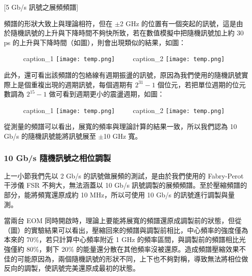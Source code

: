 \documentclass[class=NCU_thesis, crop=false]{standalone}
\begin{document}
[5 Gb/s 訊號之展頻頻譜]

頻譜的形狀大致上與理論相符，但在 $\pm$2 GHz 的位置有一個突起的訊號，這是由於隨機訊號的上升與下降時間不夠快所致，若在數值模擬中把隨機訊號加上約 30 ps 的上升與下降時間（如圖），則會出現類似的結果，如圖：

\begin{figure}[!hbt]
    \centering
    \subcaptionbox
        {caption\_1
        \label{fig:subfig_fig1}}
        {\texttt{[image: temp.png]}}
    ~~~~
    \subcaptionbox
        {caption\_2
        \label{fig:subfig_fig2}}
        {\texttt{[image: temp.png]}}
\end{figure}


此外，還可看出該頻譜的包絡線有週期振盪的訊號，原因為我們使用的隨機訊號實際上是個重複出現的週期訊號，每個週期有 $2^{31}-1$ 個位元，若把單位週期的位元數調為 $2^{15}-1$ 做可看到週期更小的震盪週期，如圖：

\begin{figure}[!hbt]
    \centering
    \subcaptionbox
        {caption\_1
        \label{fig:subfig_fig1}}
        {\texttt{[image: temp.png]}}
    ~~~~
    \subcaptionbox
        {caption\_2
        \label{fig:subfig_fig2}}
        {\texttt{[image: temp.png]}}
\end{figure}

從測量的頻譜可以看出，展寬的頻率與理論計算的結果一致，所以我們認為 10 Gb/s 的隨機訊號能將訊號展至 $\pm$10 GHz 寬。

\subsubsection{10 Gb/s 隨機訊號之相位調製}

上一小節我們先以 2 Gb/s 的訊號做展頻的測試，是由於我們使用的 Fabry-Perot 干涉儀 FSR 不夠大，無法涵蓋以 10 Gb/s 訊號調製的展頻頻譜。至於壓縮頻譜的部分，能將頻寬還原成約 10 MHz，所以可使用 10 Gb/s 的訊號進行調製與量測。

當兩台 EOM 同時開啟時，理論上要能將展寬的頻譜還原成調製前的狀態，但從（圖）的實驗結果可以看出，壓縮回來的頻譜與調製前相比，中心頻率的強度僅為本來的 70\%，若只計算中心頻率附近 1 GHz 的頻率區間，與調製前的頻譜相比光強僅約 80\%，剩下 20\% 的能量還分散在其他頻率沒被還原。造成頻譜壓縮效果不佳的可能原因為，兩個隨機訊號的形狀不同，上下也不夠對稱，導致無法將相位做反向的調製，使訊號完美還原成最初的狀態。
\end{document}
